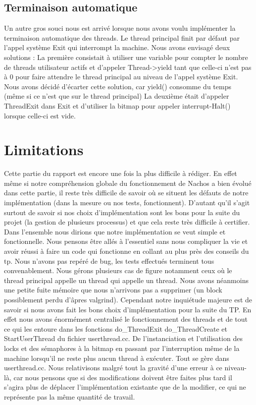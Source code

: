 \documentclass[11pt]{article}
\begin{document}
\subsection{Terminaison automatique}
Un autre gros souci nous est arrivé lorsque nous avons voulu implémenter la terminaison
automatique des threads. Le thread principal finit par défaut par l'appel système \textcolor{blue2}{Exit}
qui interrompt la machine.
Nous avons envisagé deux solutions :
La première consistait à utiliser une variable pour compter le nombre de threads utilisateur actifs
et d'appeler \textcolor{red2}{Thread->yield} tant que celle-ci n'est pas à 0 pour faire attendre le thread principal
au niveau de l'appel système \textcolor{blue2}{Exit}. Nous avons décidé d'écarter cette solution, car yield()
consomme du temps (même si ce n'est que sur le thread principal)
La deuxième était d'appeler \textcolor{blue2}{ThreadExit} dans \textcolor{blue2}{Exit} et d'utiliser la bitmap pour appeler interrupt-Halt()
lorsque celle-ci est vide.

\newpage
\section{Limitations}

Cette partie du rapport est encore une fois la plus difficile à rédiger. En effet
même si notre compréhension globale du fonctionnement de Nachos a bien évolué dans
cette partie, il reste très difficile de savoir où se situent les défauts de notre
implémentation (dans la mesure ou nos tests, fonctionnent). D'autant qu'il s'agit surtout
de savoir si nos choix d'implémentation sont les bons pour la suite du projet (la gestion
de plusieurs processus) et que cela reste très difficile à certifier.
\newline
Dans l'ensemble nous dirions que notre implémentation se veut simple et fonctionnelle.
Nous pensons être allés à l'essentiel sans nous compliquer la vie et avoir réussi à faire
un code qui fonctionne en collant au plus près des conseils du tp.
Nous n'avons pas repéré de bug, les tests effectués terminent tous convenablement. Nous gérons plusieurs
cas de figure notamment ceux où le thread principal appelle un thread qui appelle un thread.
Nous avons néanmoins une petite fuite mémoire que nous n'arrivons pas a
supprimer (un block possiblement perdu d'âpres valgrind).
Cependant notre inquiétude majeure est de savoir si nous avons fait les bons choix d'implémentation
pour la suite du TP. En effet nous avons énormément centralisé le fonctionnement des
threads et de tout ce qui les entoure dans les fonctions \textcolor{red2}{do\_ThreadExit}
\textcolor{red2}{do\_ThreadCreate} et \textcolor{red2}{StartUserThread} du fichier \textcolor{vert2}{userthread.cc}.
De l'instanciation et l'utilisation des locks et des sémaphores à la bitmap en passant par
l'interruption même de la machine lorsqu'il ne reste plus aucun thread à exécuter. Tout
se gère dans \textcolor{vert2}{userthread.cc}.
\newline
Nous relativisons malgré tout la gravité d'une erreur à ce niveau-là, car nous pensons que si
des modifications doivent être faites plus tard il s'agira plus de déplacer l'implémentation existante que de
la modifier, ce qui ne représente pas la même quantité de travail.
\end{document}
